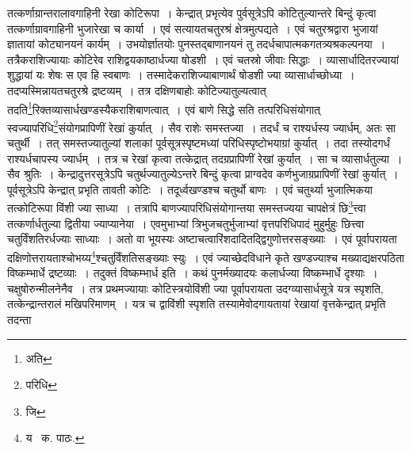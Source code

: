 \documentclass[11pt, openany]{book}
\begin{document}
\noindent तत्कर्णाग्रान्तरालावगाहिनी रेखा कोटिरूपा~। केन्द्रात् प्रभृत्येव पुर्वसूत्रेऽपि कोटितुल्यान्तरे बिन्दुं कृत्वा तत्कर्णाग्रावगाहिनी भुजारेखा च
कार्या~। एवं सत्यायतचतुरश्रं क्षेत्रमुत्पद्यते~। एवं चतुरश्रद्वारा भुजायां ज्ञातायां कोट्यानयनं कार्यम्~। उभयोर्ज्ञातयोः पुनस्तद्बाणानयनं तु तदर्धचापात्मकगतत्र्यश्रकल्पनया~। तत्रैकराशिज्यायाः कोटिरेव राशिद्वयकाष्ठार्धज्या षोडशी~। एवं चतस्रो जीवाः सिद्धाः~। व्यासार्धादितरज्यायां शुद्धायां यः शेषः स एव हि स्वबाणः~। तस्मादेकराशिज्याबाणार्थं षोडशी ज्या व्यासार्धाच्छोध्या~। तदप्यस्मिन्नायतचतुरश्रे द्रष्टव्यम्~। तत्र दक्षिणबाहोः कोटिज्यातुल्यत्वात् तदति\renewcommand{\thefootnote}{१}\footnote{अति}रिक्तव्यासार्धखण्डस्यैकराशिबाणत्वात्~। एवं बाणे सिद्धे सति तत्परिधिसंयोगात् स्वज्यापरिधि\renewcommand{\thefootnote}{२}\footnote{परिधि}संयोगप्रापिणीं रेखां कुर्यात्~। सैव राशेः समस्तज्या~। तदर्धं च राश्यर्धस्य ज्यार्धम्, अतः सा चतुर्थी~। तत् समस्तज्यातुल्यां शलाकां
पूर्वसूत्रस्पृष्टमध्यां परिधिस्पृष्टोभयाग्रां कुर्यात्~। तदा तस्योदगर्धं राश्यर्धचापस्य ज्यार्धम्~। तत्र च रेखां कृत्वा तत्केद्रात् तदग्रप्रापिणीं रेखां कुर्यात्~। सा च व्यासार्धतुल्या~। सैव श्रुतिः~। केन्द्रादुत्तरसूत्रेऽपि चतुर्थज्यातुल्येऽन्तरे बिन्दुं कृत्वा प्राग्वदेव कर्णभुजाग्रप्रापिणीं रेखां कुर्यात्~। पूर्वसूत्रेऽपि केन्द्रात् प्रभृति तावती कोटिः~। तदूर्ध्वखण्डश्च चतुर्थो बाणः~। एवं चतुर्थ्या भुजात्मिकया तत्कोटिरूपा विंशी ज्या साध्या~। तत्रापि बाणज्यापरिधिसंयोगान्तया समस्तज्यया चापक्षेत्रं छि\renewcommand{\thefootnote}{३}\footnote{जि}त्त्वा तत्कर्णार्धतुल्या द्वितीया ज्याप्यानेया~। एवमुभाभ्यां त्रिभुजचतुर्भुजाभ्यां वृत्तपरिधिपादं मुहुर्मुहुः छित्त्वा चतुर्विंशतिरर्धज्याः साध्याः~। अतो वा भूयस्यः अष्टाचत्वारिंशदादितद्द्विगुणोत्तरसङ्ख्याः~। एवं पूर्वापरायता दक्षिणोत्तरायताश्चोभय्य\renewcommand{\thefootnote}{४}\footnote{य \textendash\ क. पाठः.}श्चतुर्विंशतिसङ्ख्याः स्युः~। एवं ज्याच्छेदविधाने कृते खण्डज्याश्च मख्याद्यक्षरपठिता विष्कम्भार्धे द्रष्टव्याः~। तदुक्तं विष्कम्भार्ध इति~। कथं पुनर्मख्यादयः कलार्धज्या विष्कम्भार्धे दृश्याः~। चक्षुषोरुन्मीलनेनैव~। तत्र प्रथमज्यायाः कोटिस्त्रयोविंशी ज्या
पूर्वापरायता उदग्व्यासार्धसूत्रे यत्र स्पृशति, तत्केन्द्रान्तरालं मखिपरिमाणम्~। यत्र च द्वाविंशी स्पृशति तस्यामेवोदगायतायां रेखायां वृत्तकेन्द्रात् प्रभृति
तदन्ता

\newpage
\end{document}
